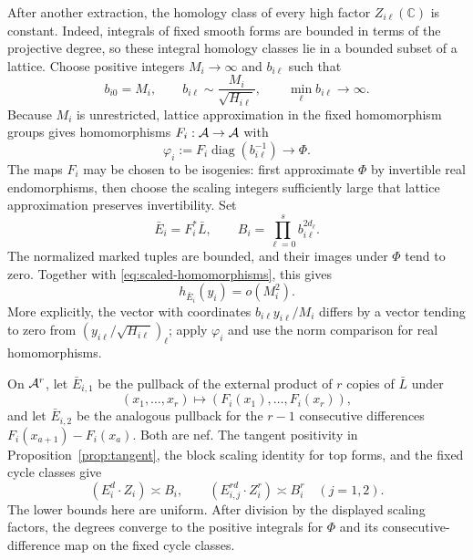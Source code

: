 After another extraction, the homology class of every high factor
\(Z_{i\ell}(\mathbb C)\) is constant.  Indeed, integrals of fixed smooth
forms are bounded in terms of the projective degree, so these integral
homology classes lie in a bounded subset of a lattice.  Choose positive
integers \(M_i\to\infty\) and \(b_{i\ell}\) such that
\[
 b_{i0}=M_i,\qquad
 b_{i\ell}\sim\frac{M_i}{\sqrt{H_{i\ell}}},\qquad
 \min_\ell b_{i\ell}\longrightarrow\infty.
\]
Because \(M_i\) is unrestricted, lattice approximation in the fixed
homomorphism groups gives homomorphisms \(F_i:\mathcal A\to\mathcal A\) with
\begin{equation}\label{eq:scaled-homomorphisms}
 \varphi_i:=F_i\operatorname{diag}(b_{i\ell}^{-1})
 \longrightarrow\Phi.
\end{equation}
The maps \(F_i\) may be chosen to be isogenies: first approximate
\(\Phi\) by invertible real endomorphisms, then choose the scaling
integers sufficiently large that lattice approximation preserves
invertibility.  Set
\[
 \bar E_i=F_i^*\bar L,\qquad
 B_i=\prod_{\ell=0}^s b_{i\ell}^{2d_\ell}.
\]
The normalized marked tuples are bounded, and their images under \(\Phi\)
tend to zero.  Together with \eqref{eq:scaled-homomorphisms}, this gives
\begin{equation}\label{eq:small-marked-height}
 h_{\bar E_i}(y_i)=o(M_i^2).
\end{equation}
More explicitly, the vector with coordinates
\(b_{i\ell}y_{i\ell}/M_i\) differs by a vector tending to zero from
\((y_{i\ell}/\sqrt{H_{i\ell}})_\ell\); apply \(\varphi_i\) and use
the norm comparison for real homomorphisms.

On \(\mathcal A^r\), let \(\bar E_{i,1}\) be the pullback of the external
product of \(r\) copies of \(\bar L\) under
\[
 (x_1,\ldots,x_r)\longmapsto(F_i(x_1),\ldots,F_i(x_r)),
\]
and let \(\bar E_{i,2}\) be the analogous pullback for the \(r-1\)
consecutive differences \(F_i(x_{a+1})-F_i(x_a)\).  Both are nef.
The tangent positivity in Proposition~\ref{prop:tangent}, the block
scaling identity for top forms, and the fixed cycle classes give
\begin{equation}\label{eq:arithmetic-geometric-degrees}
 (E_i^d\cdot Z_i)\asymp B_i,
 \qquad
 (E_{i,j}^{rd}\cdot Z_i^r)\asymp B_i^r\quad(j=1,2).
\end{equation}
The lower bounds here are uniform.  After division by the displayed
scaling factors, the degrees converge to the positive integrals for
\(\Phi\) and its consecutive-difference map on the fixed cycle classes.

